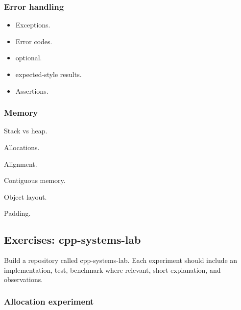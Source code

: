 \documentclass[11pt,letterpaper]{article}
\begin{document}
\subsubsection*{Error handling}

\begin{itemize}

\item Exceptions.

\item Error codes.

\item optional.

\item expected-style results.

\item Assertions.

\end{itemize}

\subsubsection*{Memory}

\begin{topics}

\item Stack vs heap.

\item Allocations.

\item Alignment.

\item Contiguous memory.

\item Object layout.

\item Padding.

\end{topics}

\subsection*{Exercises: cpp-systems-lab}

Build a repository called cpp-systems-lab. Each experiment should include an implementation, test, benchmark where relevant, short explanation, and observations.

\subsubsection*{Allocation experiment}
\end{document}
